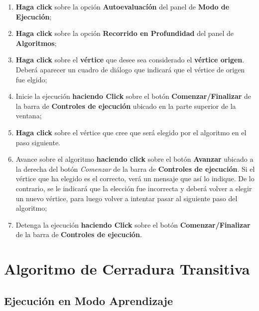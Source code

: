 \documentclass{book}
\begin{document}
\begin{enumerate}
	\itemsep=8pt \topsep=0pt \partopsep=0pt \parskip=0pt \parsep=0pt

	\item \textbf{Haga click} sobre la opción \textbf{Autoevaluacíón} del panel de \textbf{Modo de Ejecución};

	\item \textbf{Haga click} sobre la opción \textbf{Recorrido en Profundidad} del panel de \textbf{Algoritmos};

	\item \textbf{Haga click} sobre el \textbf{vértice} que desee sea considerado el \textbf{vértice origen}. Deberá aparecer un cuadro de diálogo que indicará que el vértice de origen fue elgido;

	\item Inicie la ejecución \textbf{haciendo Click} sobre el botón \textbf{Comenzar/Finalizar} de la barra de \textbf{Controles de ejecución} ubicado en la parte superior de la ventana;

	\item \textbf{Haga click} sobre el vértice que cree que será elegido por el algoritmo en el paso siguiente.

	\item Avance sobre el algoritmo \textbf{haciendo click} sobre el botón \textbf{Avanzar} ubicado a la derecha del botón \textit{Comenzar} de la barra de \textbf{Controles de ejecución}. Si el vértice que ha elegido es el correcto, verá un mensaje que así lo indique. De lo contrario, se le indicará que la elección fue incorrecta y deberá volver a elegir un nuevo vértice, para luego volver a intentar pasar al siguiente paso del algoritmo;

	\item Detenga la ejecución \textbf{haciendo Click} sobre el botón \textbf{Comenzar/Finalizar} de la barra de \textbf{Controles de ejecución}.

\end{enumerate}
\medskip





%
%
\chapter{Algoritmo de Cerradura Transitiva}


\section{Ejecución en Modo Aprendizaje}
\end{document}
